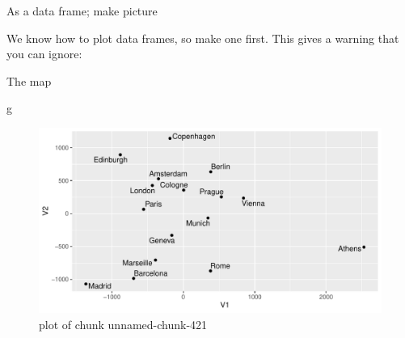 \documentclass[ignorenonframetext,]{beamer}
\newenvironment{Shaded}{\begin{snugshade}}{\end{snugshade}}
\newcommand{\DataTypeTok}[1]{\textcolor[rgb]{0.13,0.29,0.53}{#1}}
\newcommand{\KeywordTok}[1]{\textcolor[rgb]{0.13,0.29,0.53}{\textbf{#1}}}
\newcommand{\NormalTok}[1]{#1}
\newcommand{\OperatorTok}[1]{\textcolor[rgb]{0.81,0.36,0.00}{\textbf{#1}}}
\newcommand{\StringTok}[1]{\textcolor[rgb]{0.31,0.60,0.02}{#1}}
\begin{document}
\begin{frame}[fragile]{As a data frame; make picture}
\protect\hypertarget{as-a-data-frame-make-picture}{}

We know how to plot data frames, so make one first. This gives a warning
that you can ignore:

\normalsize

\begin{Shaded}
\end{Shaded}

\normalsize

\end{frame}

\begin{frame}[fragile]{The map}
\protect\hypertarget{the-map}{}

\begin{Shaded}
\begin{Highlighting}[]
\NormalTok{g}
\end{Highlighting}
\end{Shaded}

\begin{figure}
\centering
\includegraphics{figure/unnamed-chunk-421-1.pdf}
\caption{plot of chunk unnamed-chunk-421}
\end{figure}

\end{frame}
\end{document}

